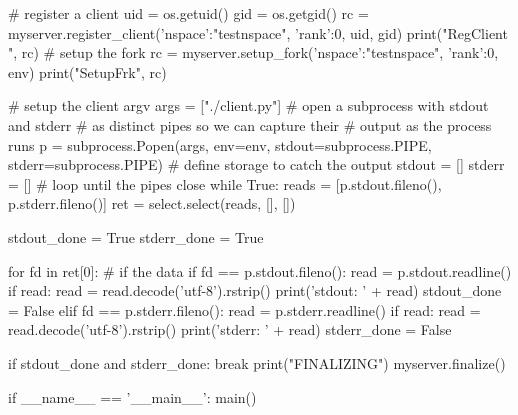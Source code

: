 \begin{codepar}
    # register a client
    uid = os.getuid()
    gid = os.getgid()
    rc = myserver.register_client({'nspace':"testnspace", 'rank':0},
                                  uid, gid)
    print("RegClient ", rc)
    # setup the fork
    rc = myserver.setup_fork({'nspace':"testnspace", 'rank':0}, env)
    print("SetupFrk", rc)

    # setup the client argv
    args = ["./client.py"]
    # open a subprocess with stdout and stderr
    # as distinct pipes so we can capture their
    # output as the process runs
    p = subprocess.Popen(args, env=env,
        stdout=subprocess.PIPE, stderr=subprocess.PIPE)
    # define storage to catch the output
    stdout = []
    stderr = []
    # loop until the pipes close
    while True:
        reads = [p.stdout.fileno(), p.stderr.fileno()]
        ret = select.select(reads, [], [])

        stdout_done = True
        stderr_done = True

        for fd in ret[0]:
            # if the data
            if fd == p.stdout.fileno():
                read = p.stdout.readline()
                if read:
                    read = read.decode('utf-8').rstrip()
                    print('stdout: ' + read)
                    stdout_done = False
            elif fd == p.stderr.fileno():
                read = p.stderr.readline()
                if read:
                    read = read.decode('utf-8').rstrip()
                    print('stderr: ' + read)
                    stderr_done = False

        if stdout_done and stderr_done:
            break
    print("FINALIZING")
    myserver.finalize()


if __name__ == '__main__':
    main()
\end{codepar}
\pyspecificend

